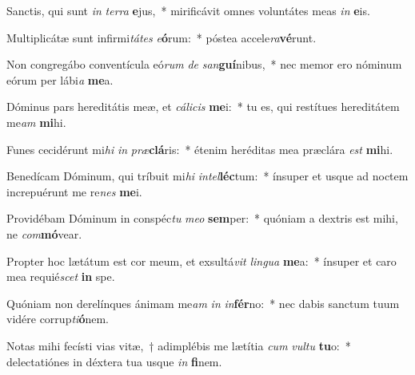 \item Sanctis, qui sunt \textit{in} \textit{ter}\textit{ra} \textbf{e}jus,~* mirificávit omnes voluntátes meas \textit{in} \textbf{e}is.
\item Multiplicátæ sunt infirmi\textit{tá}\textit{tes} \textit{e}\textbf{ó}rum:~* póstea accele\textit{ra}\textbf{vé}runt.
\item Non congregábo conventícula eó\textit{rum} \textit{de} \textit{san}\textbf{guí}nibus,~* nec memor ero nóminum eórum per lábi\textit{a} \textbf{me}a.
\item Dóminus pars hereditátis meæ, et \textit{cá}\textit{li}\textit{cis} \textbf{me}i:~* tu es, qui restítues hereditátem me\textit{am} \textbf{mi}hi.
\item Funes cecidérunt mi\textit{hi} \textit{in} \textit{præ}\textbf{clá}ris:~* étenim heréditas mea præclára \textit{est} \textbf{mi}hi.
\item Benedícam Dóminum, qui tríbuit mi\textit{hi} \textit{in}\textit{tel}\textbf{léc}tum:~* ínsuper et usque ad noctem increpuérunt me re\textit{nes} \textbf{me}i.
\item Providébam Dóminum in conspéc\textit{tu} \textit{me}\textit{o} \textbf{sem}per:~* quóniam a dextris est mihi, ne \textit{com}\textbf{mó}vear.
\item Propter hoc lætátum est cor meum, et exsultá\textit{vit} \textit{lin}\textit{gua} \textbf{me}a:~* ínsuper et caro mea requié\textit{scet} \textbf{in} spe.
\item Quóniam non derelínques ánimam me\textit{am} \textit{in} \textit{in}\textbf{fér}no:~* nec dabis sanctum tuum vidére corrup\textit{ti}\textbf{ó}nem.
\item Notas mihi fecísti vias vitæ,~† adimplébis me lætítia \textit{cum} \textit{vul}\textit{tu} \textbf{tu}o:~* delectatiónes in déxtera tua usque \textit{in} \textbf{fi}nem.
